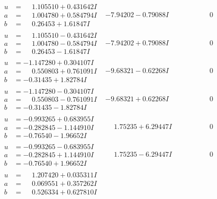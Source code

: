\documentclass[1p]{elsarticle_modified}
\theoremstyle{definition}
\begin{document}
$$\begin{array}{c|c|c}
\begin{aligned}
u &= \phantom{-}1.105510 + 0.431642 I \\
a &= \phantom{-}1.004780 + 0.584794 I \\
b &= \phantom{-}0.26453 + 1.61847 I\end{aligned}
 & -7.94202 - 0.79088 I & \phantom{-0.000000 } 0 \\ \hline\begin{aligned}
u &= \phantom{-}1.105510 - 0.431642 I \\
a &= \phantom{-}1.004780 - 0.584794 I \\
b &= \phantom{-}0.26453 - 1.61847 I\end{aligned}
 & -7.94202 + 0.79088 I & \phantom{-0.000000 } 0 \\ \hline\begin{aligned}
u &= -1.147280 + 0.304107 I \\
a &= \phantom{-}0.550803 + 0.761091 I \\
b &= -0.31435 + 1.82784 I\end{aligned}
 & -9.68321 - 0.62268 I & \phantom{-0.000000 } 0 \\ \hline\begin{aligned}
u &= -1.147280 - 0.304107 I \\
a &= \phantom{-}0.550803 - 0.761091 I \\
b &= -0.31435 - 1.82784 I\end{aligned}
 & -9.68321 + 0.62268 I & \phantom{-0.000000 } 0 \\ \hline\begin{aligned}
u &= -0.993265 + 0.683955 I \\
a &= -0.282845 - 1.144910 I \\
b &= -0.76540 - 1.96652 I\end{aligned}
 & \phantom{-}1.75235 + 6.29447 I & \phantom{-0.000000 } 0 \\ \hline\begin{aligned}
u &= -0.993265 - 0.683955 I \\
a &= -0.282845 + 1.144910 I \\
b &= -0.76540 + 1.96652 I\end{aligned}
 & \phantom{-}1.75235 - 6.29447 I & \phantom{-0.000000 } 0 \\ \hline\begin{aligned}
u &= \phantom{-}1.207420 + 0.035311 I \\
a &= \phantom{-}0.069551 + 0.357262 I \\
b &= \phantom{-}0.526334 + 0.627810 I\end{aligned}

\end{array}$$
\end{document}
